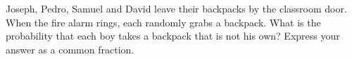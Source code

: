 Joseph, Pedro, Samuel and David leave their backpacks by the classroom door. When the fire alarm rings, each randomly grabs a backpack. What is the probability that each boy takes a backpack that is not his own? Express your answer as a common fraction.
